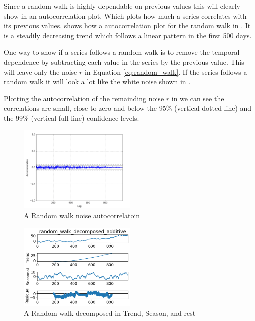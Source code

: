 Since a random walk is highly dependable on previous values this will clearly show in an autocorrelation plot.
Which plots how much a series correlates with its previous values.
 shows how a autocorrelation plot for the random walk in .
It is a steadily decreasing trend which follows a linear pattern in the first 500 days.

One way to show if a series follows a random walk is to remove the temporal dependence by subtracting each value in the series by the previous value.
This will leave only the noise $r$ in Equation \cref{eq:random_walk}.
If the series follows a random walk it will look a lot like the white noise shown in .

Plotting the autocorrelation of the remainding noise $r$ in 
we can see the correlations are small, close to zero and below the 95\% (vertical dotted line) and the 99\% (vertical full line)
confidence levels.
\begin{figure}[H]
  \centering
  \includegraphics[width=0.5\textwidth]{./figs/illustrations/random_walk_noise_autocorrelation.png}
  \hfill
  \caption{A Random walk noise autocorrelatoin}
  \label{fig:dataset:random_walk_noise_autocorrelation}
\end{figure}
\begin{figure}[H]
  \centering
  \includegraphics[width=0.5\textwidth]{./figs/code_generated/data_exploration/random_walk_decomposed_additive.png}
  \hfill
  \caption{A Random walk decomposed in Trend, Season, and rest}
  \label{fig:dataset:random_walk_decomposed}
\end{figure}


